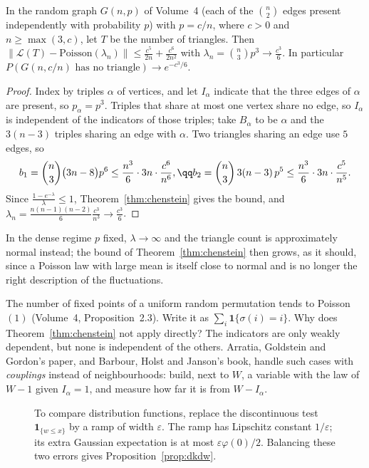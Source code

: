\begin{example}\label{ex:triangles}
In the random graph $G(n,p)$ of Volume~4 (each of the $\binom n2$ edges present independently with probability $p$) with $p=c/n$, where $c>0$ and $n\ge\max(3,c)$, let $T$ be the number of
triangles. Then $\|\mathcal L(T)-\text{Poisson}(\lambda_n)\|\le\frac{c^5}{2n}+\frac{c^6}{2n^2}$ with $\lambda_n=\binom n3p^3\to\frac{c^3}6$. In particular
$P(G(n,c/n)\text{ has no triangle})\to e^{-c^3/6}$.
\end{example}
\begin{proof}
Index by triples $\alpha$ of vertices, and let $I_\alpha$ indicate that the three edges of $\alpha$ are present, so $p_\alpha=p^3$. Triples that share at most one vertex share
no edge, so $I_\alpha$ is independent of the indicators of those triples; take $B_\alpha$ to be $\alpha$ and the $3(n-3)$ triples sharing an edge with $\alpha$.
Two triangles sharing an edge use $5$ edges, so
\[
\begin{gathered}b_1=\binom n3\bigl(3n-8\bigr)p^6\le\frac{n^3}6\cdot3n\cdot\frac{c^6}{n^6},\qq b_2=\binom n3\,3(n-3)\,p^5\le\frac{n^3}6\cdot3n\cdot\frac{c^5}{n^5}.\end{gathered}
\]
Since $\frac{1-e^{-\lambda}}\lambda\le1$, Theorem~\ref{thm:chenstein} gives the bound, and $\lambda_n=\frac{n(n-1)(n-2)}6\frac{c^3}{n^3}\to\frac{c^3}6$.
\end{proof}

In the dense regime $p$ fixed, $\lambda\to\infty$ and the triangle count is approximately normal instead; the bound of Theorem~\ref{thm:chenstein} then grows, as it
should, since a Poisson law with large mean is itself close to normal and is no longer the right description of the fluctuations.

\begin{think}
The number of fixed points of a uniform random permutation tends to Poisson$(1)$ (Volume~4, Proposition~2.3). Write it as $\sum_i\mathbf 1\{\sigma(i)=i\}$. Why does
Theorem~\ref{thm:chenstein} not apply directly? The indicators are only weakly dependent, but none is independent of the others. Arratia, Goldstein and
Gordon's paper, and Barbour, Holst and Janson's book, handle such cases with \emph{couplings} instead of neighbourhoods: build, next to $W$, a variable with the
law of $W-1$ given $I_\alpha=1$, and measure how far it is from $W-I_\alpha$.
\end{think}

\begin{figure}[ht]
\centering{}
\caption{To compare distribution functions, replace the discontinuous test $\mathbf1_{\{w\le x\}}$ by a ramp of width $\varepsilon$. The ramp has Lipschitz constant $1/\varepsilon$; its extra Gaussian expectation is at most $\varepsilon\varphi(0)/2$. Balancing these two errors gives Proposition~\ref{prop:dkdw}.}
\label{fig:v11-ch06-test-ramp}
\end{figure}

